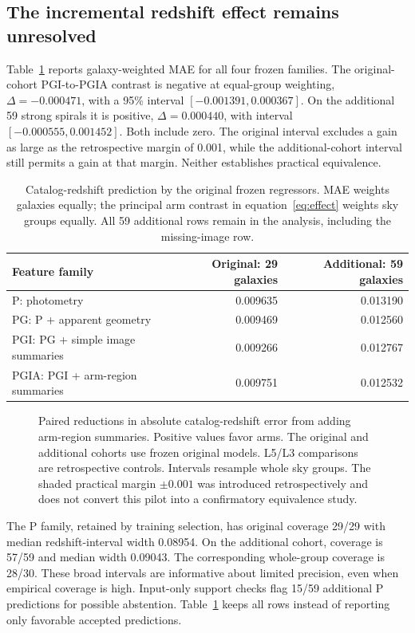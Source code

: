 \documentclass[11pt]{article}
\begin{document}
\subsection{The incremental redshift effect remains unresolved}
Table~\ref{tab:redshift} reports galaxy-weighted MAE for all four frozen
families. The original-cohort PGI-to-PGIA contrast is negative at equal-group
weighting, $\Delta=-0.000471$, with a 95\% interval
$[-0.001391,0.000367]$. On the additional 59 strong spirals it is positive,
$\Delta=0.000440$, with interval $[-0.000555,0.001452]$.
Both include zero. The original interval excludes a gain as large as the
retrospective margin of 0.001, while the additional-cohort interval still
permits a gain at that margin. Neither establishes practical equivalence.

\begin{table}[tb]
\centering
\caption{Catalog-redshift prediction by the original frozen regressors.
MAE weights galaxies equally; the principal arm contrast in
equation~\eqref{eq:effect} weights sky groups equally. All 59 additional rows
remain in the analysis, including the missing-image row.}
\label{tab:redshift}
\begin{tabular}{lrr}
\toprule
Feature family & Original: 29 galaxies & Additional: 59 galaxies\\
\midrule
P: photometry & 0.009635 & 0.013190\\
PG: P + apparent geometry & 0.009469 & 0.012560\\
PGI: PG + simple image summaries & 0.009266 & 0.012767\\
PGIA: PGI + arm-region summaries & 0.009751 & 0.012532\\
\bottomrule
\end{tabular}
\end{table}

\begin{figure}[htbp]
\centering{}
\caption{Paired reductions in absolute catalog-redshift error from adding
arm-region summaries. Positive values favor arms. The original and additional
cohorts use frozen original models. L5/L3 comparisons are retrospective
controls. Intervals resample whole sky groups. The shaded practical margin
$\pm0.001$ was introduced retrospectively and does not convert this pilot into
a confirmatory equivalence study.}
\label{fig:effects}
\end{figure}

The P family, retained by training selection, has original coverage 29/29
with median redshift-interval width 0.08954. On the additional cohort, coverage
is 57/59 and median width 0.09043. The corresponding whole-group coverage is
28/30. These broad intervals are informative about limited precision, even
when empirical coverage is high. Input-only support checks flag 15/59
additional P predictions for possible abstention. Table~\ref{tab:redshift}
keeps all rows instead of reporting only favorable accepted predictions.
\end{document}
